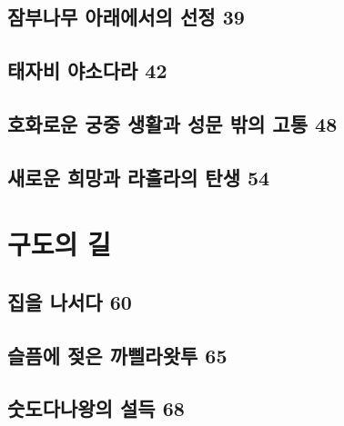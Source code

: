\documentclass[12pt, a4paper, oneside]{book}
\let\stdsection\section
\renewcommand\section{\newpage\stdsection}
\begin{document}
%
	\section{잠부나무 아래에서의 선정 39 }

%
	\section{ 태자비 야소다라 42 }

%
	\section{호화로운 궁중 생활과 성문 밖의 고통 48 }

%
	\section{새로운 희망과 라훌라의 탄생 54}




	\chapter{구도의 길}
	\noptcrule
	\parttoc			


	\section{집을 나서다 60 }

	\section{슬픔에 젖은 까삘라왓투 65 }

	\section{숫도다나왕의 설득 68 }
\end{document}
